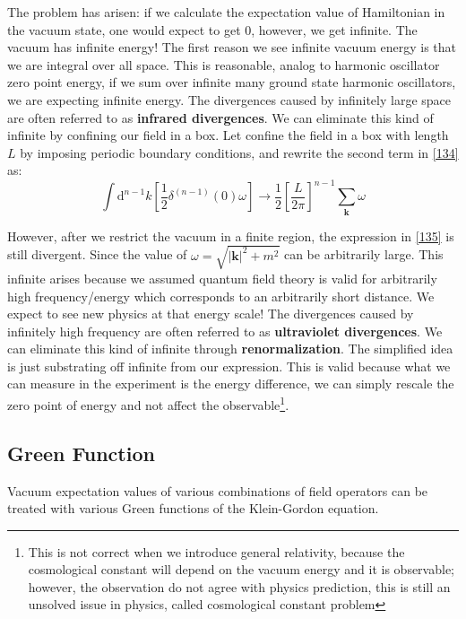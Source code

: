 \documentclass[12pt]{article}
\numberwithin{equation}{section}
\theoremstyle{1style}
\newcommand{\tbf}[1]{\textbf{#1}}
\newcommand{\id}{\mathrm{d}}
\begin{document}
The problem has arisen: if we calculate the expectation value of Hamiltonian in the vacuum state, one would expect to get 0,
however, we get infinite.
The vacuum has infinite energy!
The first reason we see infinite vacuum energy is that we are integral over all space. This is reasonable, analog
to harmonic oscillator zero point energy,
if we sum over infinite many ground state harmonic oscillators, we are expecting infinite energy.
The divergences caused by infinitely large space are often referred to as \tbf{infrared divergences}.
We can eliminate this kind of infinite by confining our field in a box.
Let confine the field in a box with length \(L\) by imposing periodic boundary conditions, and rewrite the second term in \ref{134} as:
\begin{equation}\label{135}
  \int \id^{n-1}k\left[\frac{1}{2}\delta^{(n-1)}(0)\omega\right]\rightarrow\frac{1}{2}\left[\frac{L}{2\pi}\right]^{n-1}\sum_{\mathbf{k}}\omega
\end{equation}

However, after we restrict the vacuum in a finite region, the expression in \ref{135} is still divergent.
Since the value of \(\omega=\sqrt{|\mathbf{k}|^2+m^2}\) can be arbitrarily large.
This infinite arises because we assumed quantum field theory is valid for arbitrarily high frequency/energy
which corresponds to an arbitrarily short distance. We expect to see new physics at that energy scale!
The divergences caused by infinitely high frequency are often referred to as \tbf{ultraviolet divergences}.
We can eliminate this kind of infinite through \tbf{renormalization}.
The simplified idea is just substrating off infinite from our expression.
This is valid because what we can measure in the experiment is the energy difference,
we can simply rescale the zero point of energy and not affect the observable\footnote{This is not correct when we introduce general relativity, 
because the cosmological constant will depend on the vacuum energy and it is observable; however, 
the observation do not agree with physics prediction,
this is still an unsolved issue in physics, called cosmological constant problem}.





\subsection{Green Function}
Vacuum expectation values of various combinations of field operators can be treated with various Green functions of the Klein-Gordon equation.
\end{document}
